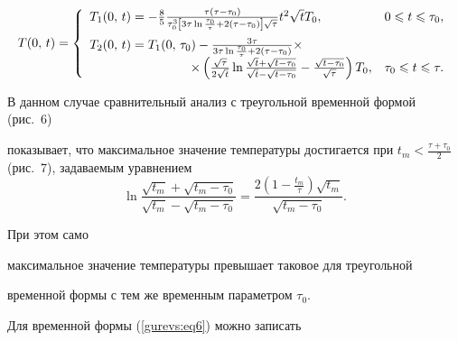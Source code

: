 \begin{equation}

\label{gurevs:eq12}

T(0,\,t) = \left\{ {\begin{array}{ll}

 T_1 (0,\,t) = - \frac{8}{5}\frac{\tau \left( {\tau - \tau _0 } \right)}{\tau 

_0 ^3\left[ {3\tau \ln \frac{\tau _0 }{\tau } + 2\left( {\tau - \tau _0 } 

\right)} \right]\sqrt \tau }t^2\sqrt t T_0 ,&

0 \leqslant t \leqslant \tau _0, \vspace{2mm}

\\ 

 T_2 (0,\,t) = T_1 (0,\,\tau _0 ) - \frac{3\tau }{3\tau \ln \frac{\tau _0 }{\tau 

} + 2\left( {\tau - \tau _0 } \right)}\times \\ 

\qquad \qquad \qquad  \qquad \times \left( {\frac{\sqrt \tau }{2\sqrt t 

}\ln \frac{\sqrt t + \sqrt {t - \tau _0 } }{\sqrt t - \sqrt {t - \tau _0 } } 

- \frac{\sqrt {t - \tau _0 } }{\sqrt \tau }} \right)T_0 , &

\tau _0 \leqslant t \leqslant \tau. 

 \end{array}} \right.

\end{equation}

В данном случае сравнительный анализ с треугольной временной формой (рис.~6) 

показывает, что максимальное значение температуры достигается при $t_m < 

\frac{\tau + \tau _0 }  2$ (рис.~7), задаваемым уравнением $$\ln \frac{\sqrt {t_m } + \sqrt {t_m - \tau _0 } } 

{\sqrt {t_m } - \sqrt {t_m - \tau _0 } }  = \frac{2\left( 1 - \frac{t_m }{\tau}  \right)\sqrt {t_m }}{ \sqrt {t_m - \tau _0 }} .$$

 При этом само 

максимальное значение температуры превышает таковое для треугольной 

временной формы с тем же временным параметром \textit{$\tau $}$_{0}$.





Для временной формы (\ref{gurevs:eq6}) можно записать

